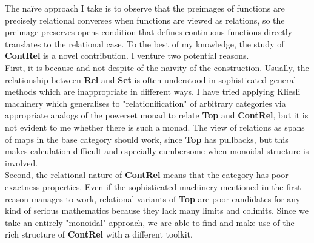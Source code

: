
The na\"{i}ve approach I take is to observe that the preimages of functions are precisely relational converses when functions are viewed as relations, so the preimage-preserves-opens condition that defines continuous functions directly translates to the relational case. To the best of my knowledge, the study of \textbf{ContRel} is a novel contribution. I venture two potential reasons.\\

First, it is because and not despite of the na\"{i}vity of the construction. Usually, the relationship between \textbf{Rel} and \textbf{Set} is often understood in sophisticated general methods which are inappropriate in different ways. I have tried applying Kliesli machinery which generalises to "relationification" of arbitrary categories via appropriate analogs of the powerset monad to relate \textbf{Top} and \textbf{ContRel}, but it is not evident to me whether there is such a monad. The view of relations as spans of maps in the base category should work, since \textbf{Top} has pullbacks, but this makes calculation difficult and especially cumbersome when monoidal structure is involved.\\

Second, the relational nature of \textbf{ContRel} means that the category has poor exactness properties. Even if the sophisticated machinery mentioned in the first reason manages to work, relational variants of \textbf{Top} are poor candidates for any kind of serious mathematics because they lack many limits and colimits. Since we take an entirely "monoidal" approach, we are able to find and make use of the rich structure of \textbf{ContRel} with a different toolkit.
